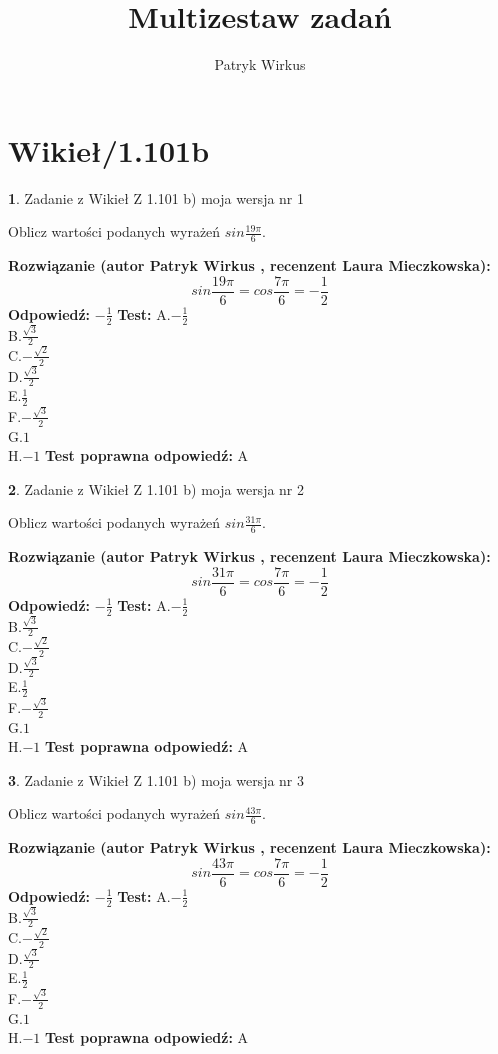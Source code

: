 \documentclass[12pt, a4paper]{article}
\title{Multizestaw zadań}
\author{Patryk Wirkus}
\date{}
\theoremstyle{definition} %
\newtheorem{zad}{}
\newcommand{\kategoria}[1]{\section{#1}}
\newcommand{\zadStart}[1]{\begin{zad}#1\newline}
\newcommand{\zadStop}{\end{zad}}
\newcommand{\rozwStart}[2]{\noindent \textbf{Rozwiązanie (autor #1 , recenzent #2): }\newline}
\newcommand{\rozwStop}{\newline}
\newcommand{\odpStart}{\noindent \textbf{Odpowiedź:}\newline}
\newcommand{\odpStop}{\newline}
\newcommand{\testStart}{\noindent \textbf{Test:}\newline}
\newcommand{\testStop}{\newline}
\newcommand{\kluczStart}{\noindent \textbf{Test poprawna odpowiedź:}\newline}
\newcommand{\kluczStop}{\newline}
\begin{document}
\maketitle

\kategoria{Wikieł/1.101b}


\zadStart{Zadanie z Wikieł Z 1.101 b) moja wersja nr 1}

Oblicz wartości podanych wyrażeń $sin \frac{19\pi}{6}$.
\zadStop
\rozwStart{Patryk Wirkus}{Laura Mieczkowska}
$$sin \frac{19\pi}{6} = cos \frac{7\pi}{6} = -\frac{1}{2}$$
\rozwStop
\odpStart
$-\frac{1}{2}$
\odpStop
\testStart
A.$-\frac{1}{2}$\\
B.$\frac{\sqrt{3}}{2}$\\
C.$-\frac{\sqrt{2}}{2}$\\
D.$\frac{\sqrt{3}}{2}$\\
E.$\frac{1}{2}$\\
F.$-\frac{\sqrt{3}}{2}$\\
G.$1$\\
H.$-1$
\testStop
\kluczStart
A
\kluczStop



\zadStart{Zadanie z Wikieł Z 1.101 b) moja wersja nr 2}

Oblicz wartości podanych wyrażeń $sin \frac{31\pi}{6}$.
\zadStop
\rozwStart{Patryk Wirkus}{Laura Mieczkowska}
$$sin \frac{31\pi}{6} = cos \frac{7\pi}{6} = -\frac{1}{2}$$
\rozwStop
\odpStart
$-\frac{1}{2}$
\odpStop
\testStart
A.$-\frac{1}{2}$\\
B.$\frac{\sqrt{3}}{2}$\\
C.$-\frac{\sqrt{2}}{2}$\\
D.$\frac{\sqrt{3}}{2}$\\
E.$\frac{1}{2}$\\
F.$-\frac{\sqrt{3}}{2}$\\
G.$1$\\
H.$-1$
\testStop
\kluczStart
A
\kluczStop



\zadStart{Zadanie z Wikieł Z 1.101 b) moja wersja nr 3}

Oblicz wartości podanych wyrażeń $sin \frac{43\pi}{6}$.
\zadStop
\rozwStart{Patryk Wirkus}{Laura Mieczkowska}
$$sin \frac{43\pi}{6} = cos \frac{7\pi}{6} = -\frac{1}{2}$$
\rozwStop
\odpStart
$-\frac{1}{2}$
\odpStop
\testStart
A.$-\frac{1}{2}$\\
B.$\frac{\sqrt{3}}{2}$\\
C.$-\frac{\sqrt{2}}{2}$\\
D.$\frac{\sqrt{3}}{2}$\\
E.$\frac{1}{2}$\\
F.$-\frac{\sqrt{3}}{2}$\\
G.$1$\\
H.$-1$
\testStop
\kluczStart
A
\kluczStop
\end{document}
